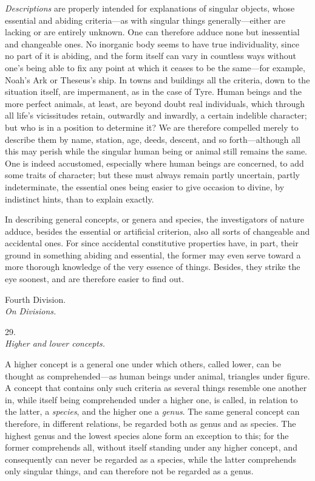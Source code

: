 \documentclass[12pt,a4paper]{article}
\newcommand{\logsec}[2]{%
  \bigskip\begin{center}{\large #1}\\[4pt]{\emph{#2}}\end{center}\smallskip}
\begin{document}
\noindent
\emph{Descriptions} are properly intended for explanations of singular objects,
whose essential and abiding criteria---as with singular things generally---either
are lacking or are entirely unknown. One can therefore adduce none but
inessential and changeable ones. No inorganic body seems to have true
individuality, since no part of it is abiding, and the form itself can vary in
countless ways without one's being able to fix any point at which it ceases to
be the same---for example, Noah's Ark or Theseus's ship. In towns and buildings
all the criteria, down to the situation itself, are impermanent, as in the case
of Tyre. Human beings and the more perfect animals, at least, are beyond doubt
real individuals, which through all life's vicissitudes retain, outwardly and
inwardly, a certain indelible character; but who is in a position to determine
it? We are therefore compelled merely to describe them by name, station, age,
deeds, descent, and so forth---although all this may perish while the singular
human being or animal still remains the same. One is indeed accustomed,
especially where human beings are concerned, to add some traits of character;
but these must always remain partly uncertain, partly indeterminate, the
essential ones being easier to give occasion to divine, by indistinct hints,
than to explain exactly.

In describing general concepts, or genera and species, the investigators of
nature adduce, besides the essential or artificial criterion, also all sorts of
changeable and accidental ones. For since accidental constitutive properties
have, in part, their ground in something abiding and essential, the former may
even serve toward a more thorough knowledge of the very essence of things.
Besides, they strike the eye soonest, and are therefore easier to find out.

\bigskip
\begin{center}
  {\Large Fourth Division.}\\[6pt]
  {\large \emph{On Divisions.}}
\end{center}

\logsec{29.}{Higher and lower concepts.}

\noindent
A higher concept is a general one under which others, called lower, can be
thought as
comprehended---as human beings under animal, triangles under figure. A concept
that contains only such criteria as several things resemble one another in,
while itself being comprehended under a higher one, is called, in relation to
the latter, a \emph{species}, and the higher one a \emph{genus}. The same
general concept can therefore, in different relations, be regarded both as genus
and as species. The highest genus and the lowest species alone form an exception
to this; for the former comprehends all, without itself standing under any
higher concept, and consequently can never be regarded as a species, while the
latter comprehends only singular things, and can therefore not be regarded as a
genus.
\end{document}
